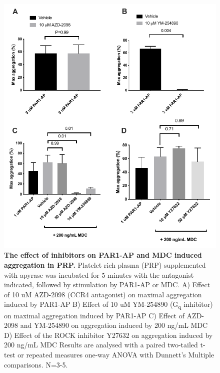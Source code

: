 \documentclass[11pt,twoside]{bristolthesis}
\begin{document}
\begin{figure}
\includegraphics[width=0.95\linewidth]{figure/Chemokines/Layouts/PAR1_MDC_inhibitors_aggregation} \caption[The effect of inhibitors on PAR1-AP and MDC induced aggregation in PRP.]{\textbf{The effect of inhibitors on PAR1-AP and MDC induced aggregation in PRP.} Platelet rich plasma (PRP) supplemented with apyrase was incubated for 5 minutes with the antagonist indicated, followed by stimulation by PAR1-AP or MDC. A) Effect of 10 uM AZD-2098 (CCR4 antagonist) on maximal aggregation induced by PAR1-AP B) Effect of 10 uM YM-254890 (G\textsubscript{q} inhibitor) on maximal aggregation induced by PAR1-AP C) Effect of AZD-2098 and YM-254890 on aggregation induced by 200 ng/mL MDC D) Effect of the ROCK inhibitor Y27632 on aggregation induced by 200 ng/mL MDC Results are analysed with a paired two-tailed t-test or repeated measures one-way ANOVA with Dunnett's Multiple comparisons. N=3-5.}\label{fig:MDC-PRP-agg-bar}
\end{figure}
\end{document}

